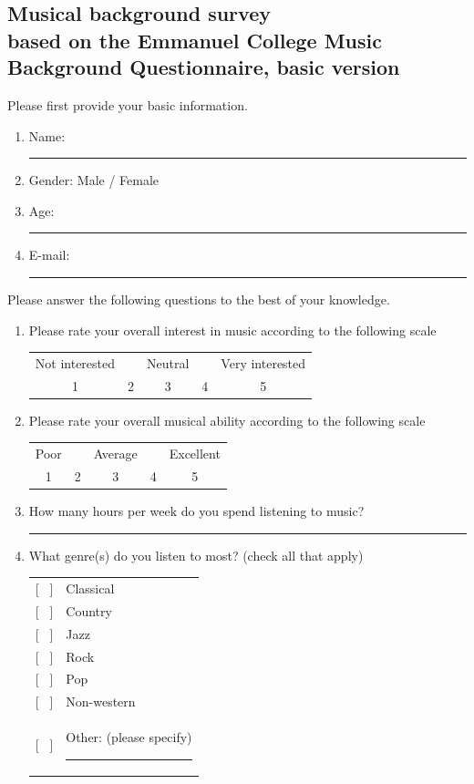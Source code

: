 \documentclass[a4paper,11pt]{article}
\newcommand{\myunderline}{\rule{2in}{.5pt}}
\begin{document}
{\begin{appendices}

\section[Musical background survey]{Musical background survey\\
	{\normalsize based on the Emmanuel College Music Background Questionnaire, basic version}}

Please first provide your basic information.

\begin{enumerate}
	\item Name: \myunderline
	\item Gender: Male / Female
	\item Age: \myunderline
	\item E-mail: \myunderline
\end{enumerate}
Please answer the following questions to the best of your knowledge.
\begin{enumerate}[resume]

	\item Please rate your overall interest in music according to the following scale

	\begin{tabular}{c c c c c}
		Not interested & & Neutral & & Very interested \\
		1 & 2 & 3 & 4 & 5 \\
	\end{tabular}

	\item Please rate your overall musical ability according to the following scale

	\begin{tabular}{c c c c c}
		Poor & & Average & & Excellent \\
		1 & 2 & 3 & 4 & 5 \\
	\end{tabular}

	\item How many hours per week do you spend listening to music?

	\myunderline

	\item What genre(s) do you listen to most? (check all that apply)

	\begin{tabular}{l l}
		{[{ \ }]} & Classical \\
		{[{ \ }]} & Country \\
		{[{ \ }]} & Jazz \\
		{[{ \ }]} & Rock \\
		{[{ \ }]} & Pop \\
		{[{ \ }]} & Non-western \\
		{[{ \ }]} & Other: (please specify) \myunderline \\
	\end{tabular}


\end{enumerate}
\end{appendices}}
\end{document}
